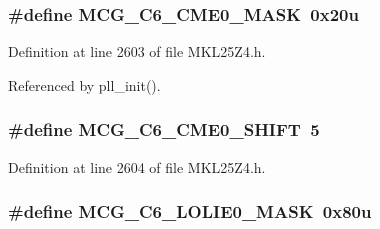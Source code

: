 \subsubsection[{\texorpdfstring{M\+C\+G\+\_\+\+C6\+\_\+\+C\+M\+E0\+\_\+\+M\+A\+SK}{MCG_C6_CME0_MASK}}]{\setlength{\rightskip}{0pt plus 5cm}\#define M\+C\+G\+\_\+\+C6\+\_\+\+C\+M\+E0\+\_\+\+M\+A\+SK~0x20u}\hypertarget{group___m_c_g___register___masks_ga2e0daa102ec3f225ed9297f7bc9f8239}{}\label{group___m_c_g___register___masks_ga2e0daa102ec3f225ed9297f7bc9f8239}


Definition at line 2603 of file M\+K\+L25\+Z4.\+h.



Referenced by pll\+\_\+init().

\subsubsection[{\texorpdfstring{M\+C\+G\+\_\+\+C6\+\_\+\+C\+M\+E0\+\_\+\+S\+H\+I\+FT}{MCG_C6_CME0_SHIFT}}]{\setlength{\rightskip}{0pt plus 5cm}\#define M\+C\+G\+\_\+\+C6\+\_\+\+C\+M\+E0\+\_\+\+S\+H\+I\+FT~5}\hypertarget{group___m_c_g___register___masks_ga096e62e71f69f5b749999d671d800090}{}\label{group___m_c_g___register___masks_ga096e62e71f69f5b749999d671d800090}


Definition at line 2604 of file M\+K\+L25\+Z4.\+h.

\subsubsection[{\texorpdfstring{M\+C\+G\+\_\+\+C6\+\_\+\+L\+O\+L\+I\+E0\+\_\+\+M\+A\+SK}{MCG_C6_LOLIE0_MASK}}]{\setlength{\rightskip}{0pt plus 5cm}\#define M\+C\+G\+\_\+\+C6\+\_\+\+L\+O\+L\+I\+E0\+\_\+\+M\+A\+SK~0x80u}\hypertarget{group___m_c_g___register___masks_ga0b0e7ca112d81e86d413c014d144fd8d}{}\label{group___m_c_g___register___masks_ga0b0e7ca112d81e86d413c014d144fd8d}


